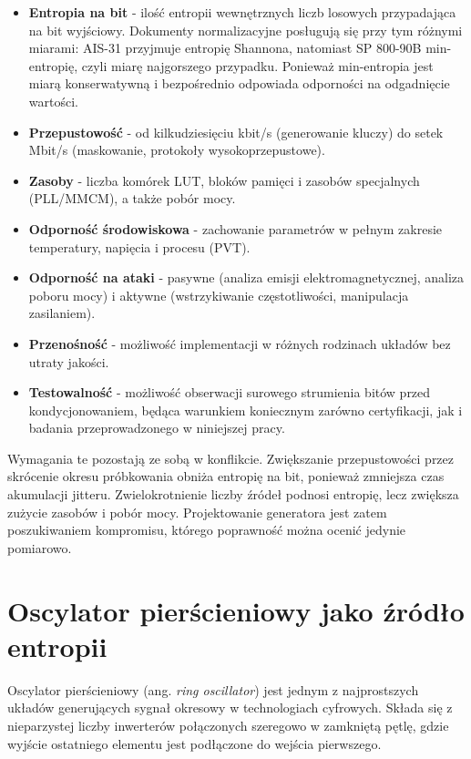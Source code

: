\begin{itemize}
  \item \textbf{Entropia na bit} - ilość entropii wewnętrznych liczb losowych
        przypadająca na bit wyjściowy. Dokumenty normalizacyjne posługują się
        przy tym różnymi miarami: AIS-31 \cite{killmann2011ais31} przyjmuje
        entropię Shannona, natomiast SP 800-90B \cite{turan2018sp80090b}
        min-entropię, czyli miarę najgorszego przypadku. Ponieważ min-entropia
        jest miarą konserwatywną i bezpośrednio odpowiada odporności na
        odgadnięcie wartości.
  \item \textbf{Przepustowość} - od kilkudziesięciu kbit/s (generowanie
        kluczy) do setek Mbit/s (maskowanie, protokoły wysokoprzepustowe).
  \item \textbf{Zasoby} - liczba komórek LUT, bloków pamięci
        i zasobów specjalnych (PLL/MMCM), a także pobór mocy.
  \item \textbf{Odporność środowiskowa} - zachowanie parametrów w pełnym
        zakresie temperatury, napięcia i procesu (PVT).
  \item \textbf{Odporność na ataki} - pasywne (analiza emisji
        elektromagnetycznej, analiza poboru mocy) i aktywne (wstrzykiwanie
        częstotliwości, manipulacja zasilaniem).
  \item \textbf{Przenośność} - możliwość implementacji w różnych rodzinach
        układów bez utraty jakości.
  \item \textbf{Testowalność} - możliwość obserwacji surowego strumienia
        bitów przed kondycjonowaniem, będąca warunkiem koniecznym zarówno
        certyfikacji, jak i badania przeprowadzonego w niniejszej pracy.
\end{itemize}

Wymagania te pozostają ze sobą w konflikcie. Zwiększanie przepustowości przez
skrócenie okresu próbkowania obniża entropię na bit, ponieważ zmniejsza czas
akumulacji jitteru. Zwielokrotnienie liczby źródeł podnosi entropię, lecz
zwiększa zużycie zasobów i pobór mocy.
Projektowanie generatora jest zatem poszukiwaniem kompromisu, którego
poprawność można ocenić jedynie pomiarowo.

\section{Oscylator pierścieniowy jako źródło entropii}

Oscylator pierścieniowy (ang. \emph{ring oscillator}) jest jednym z
najprostszych układów generujących sygnał okresowy w technologiach
cyfrowych. Składa się z nieparzystej liczby inwerterów połączonych
szeregowo w zamkniętą pętlę, gdzie wyjście ostatniego elementu jest
podłączone do wejścia pierwszego.


